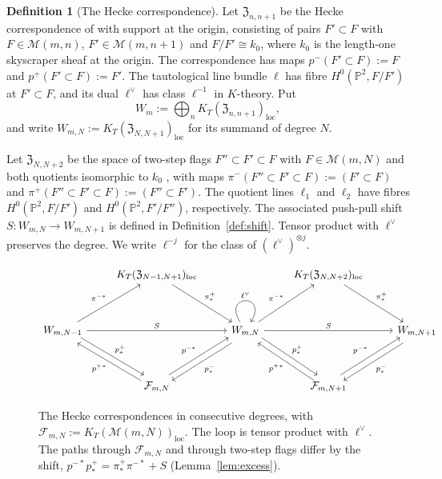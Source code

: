\documentclass[11pt]{amsart}
\theoremstyle{definition}
\newtheorem{definition}[theorem]{Definition}
\theoremstyle{remark}
\newcommand{\Wdeg}[2]{W_{#1,#2}}                 %
\newcommand{\Fdeg}[2]{\mathcal F_{#1,#2}}         %
\newcommand{\Ptwo}{\mathbb P^2}
\newcommand{\skyO}{k_0}                          %
\newcommand{\Kloc}[1]{K_T(#1)_{\mathrm{loc}}}    %
\newcommand{\Gies}[2]{\mathcal M(#1,#2)}         %
\newcommand{\Zc}{\mathfrak Z}
\newcommand{\Hecke}[1]{\Zc_{#1,#1+1}}            %
\newcommand{\HeckeTwo}[1]{\Zc_{#1,#1+2}}         %
\newcommand{\Sh}{F}                              %
\newcommand{\Wsp}[1]{W_{#1}}                     %
\newcommand{\pminus}{p^-}                        %
\newcommand{\pplus}{p^+}                         %
\newcommand{\taut}{\ell}                         %
\newcommand{\dtaut}{\taut^{\vee}}                %
\newcommand{\tautone}{\ell_1}
\newcommand{\tauttwo}{\ell_2}
\newcommand{\pulm}{p^{-*}}                       %
\newcommand{\pushp}{p^+_*}                       %
\newcommand{\pim}{\pi^-}                         %
\newcommand{\pip}{\pi^+}                         %
\newcommand{\pimpull}{\pi^{-*}}                  %
\newcommand{\pippush}{\pi^+_*}                   %
\newcommand{\Shift}{S}                           %
\begin{document}
\begin{definition}[The Hecke correspondence]\label{def:space}
Let \(\Hecke{n}\) be the Hecke correspondence of \cite{N1} with support at the
origin, consisting of pairs \(\Sh'\subset\Sh\) with \(\Sh\in\Gies{m}{n}\),
\(\Sh'\in\Gies{m}{n+1}\) and \(\Sh/\Sh'\cong\skyO\), where \(\skyO\) is the
length-one skyscraper sheaf at the origin.
The correspondence has maps
\(\pminus(\Sh'\subset\Sh):=\Sh\) and \(\pplus(\Sh'\subset\Sh):=\Sh'\).
The tautological line bundle \(\taut\) has fibre \(H^0(\Ptwo,\Sh/\Sh')\) at
\(\Sh'\subset\Sh\), and its dual \(\dtaut\) has class \(\taut^{-1}\) in \(K\)-theory. Put
\[
 \Wsp{m}:=\bigoplus_n\Kloc{\Hecke{n}},
\]
and write \(\Wdeg{m}{N}:=\Kloc{\Hecke{N}}\) for its summand of degree \(N\).
\end{definition}

Let \(\HeckeTwo{N}\) be the space of two-step flags \(\Sh''\subset\Sh'\subset\Sh\)
with \(\Sh\in\Gies{m}{N}\) and both quotients isomorphic to \(\skyO\) \cite{N1,N2}, with maps
\(\pim(\Sh''\subset\Sh'\subset\Sh):=(\Sh'\subset\Sh)\) and
\(\pip(\Sh''\subset\Sh'\subset\Sh):=(\Sh''\subset\Sh')\).
The quotient lines \(\tautone\) and \(\tauttwo\) have fibres
\(H^0(\Ptwo,\Sh/\Sh')\) and \(H^0(\Ptwo,\Sh'/\Sh'')\), respectively.
The associated push-pull shift
\(\Shift\colon\Wdeg{m}{N}\to\Wdeg{m}{N+1}\) is defined in
Definition~\ref{def:shift}. Tensor product with \(\dtaut\) preserves the degree.
We write \(\taut^{-j}\) for the class
of \((\dtaut)^{\otimes j}\).

\begin{figure}[H]
\[
\begin{tikzcd}[column sep=2.4em, row sep=3.6em]
 & \Kloc{\Zc_{N-1,N+1}} \arrow[dr, "\pippush"] & & \Kloc{\HeckeTwo{N}} \arrow[dr, "\pippush"] & \\
 \Wdeg{m}{N-1} \arrow[ur, "\pimpull"] \arrow[rr, "\Shift"] \arrow[dr, shift left=0.7ex, "\pushp"]
 & & \Wdeg{m}{N} \arrow[ur, "\pimpull"] \arrow[rr, "\Shift"] \arrow[dr, shift left=0.7ex, "\pushp"]
     \arrow[dl, shift left=0.7ex, "\pminus_*"] \arrow["\dtaut", loop, out=122, in=58, distance=3.2em]
 & & \Wdeg{m}{N+1} \arrow[dl, shift left=0.7ex, "\pminus_*"] \\
 & \Fdeg{m}{N} \arrow[ur, shift left=0.7ex, "\pulm"] \arrow[ul, shift left=0.7ex, "\pplus{}^*"]
 & & \Fdeg{m}{N+1} \arrow[ur, shift left=0.7ex, "\pulm"] \arrow[ul, shift left=0.7ex, "\pplus{}^*"] &
\end{tikzcd}
\]
\caption{The Hecke correspondences in consecutive degrees, with
\(\Fdeg{m}{N}:=\Kloc{\Gies{m}{N}}\). The loop is tensor product with \(\dtaut\).
The paths through \(\Fdeg{m}{N}\) and through two-step flags differ by the shift,
\(\pulm\pushp=\pippush\pimpull+\Shift\) (Lemma~\ref{lem:excess}).}\label{fig:Wm}
\end{figure}
\end{document}
